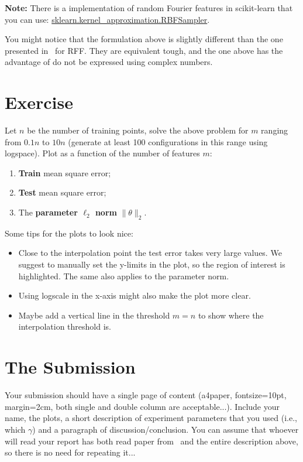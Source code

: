 \documentclass[a4paper,10pt]{article}
\newenvironment{note}
{
\begin{center}
\begin{lrbox}{\mybox}
\begin{minipage}{42em}}
{\end{minipage}
\end{lrbox}\fbox{\usebox{\mybox}}
\end{center}}
\begin{document}
    \begin{note}
    \textbf{Note:} There is a implementation of random Fourier features in scikit-learn that you can use:
    \href{https://scikit-learn.org/stable/modules/generated/sklearn.kernel_approximation.RBFSampler.html}{sklearn.kernel\_approximation.RBFSampler}.
    \end{note}
    
    \begin{note}
    You might notice that the formulation above is slightly different than the one presented in~\citet{belkin_reconciling_2019} for RFF. They are equivalent tough, and the one above has the advantage of do not be expressed using complex numbers.
    \end{note}
    

    

\section*{Exercise}

Let $n$ be the number of training points, solve the above problem for $m$ ranging from $0.1n$ to $10 n$ (generate at least 100 configurations in this range using logspace). Plot as a function of the number of features $m$:
\begin{enumerate}
    \item \textbf{Train} mean square error; 
    \item \textbf{Test} mean square error;
    \item  The \textbf{parameter $\ell_2$ norm} $\|\theta\|_2$.
\end{enumerate}

   \begin{note}
    Some tips for the plots to look nice:
    \begin{itemize}
        \item Close to the interpolation point the test error takes very
        large values. We suggest to manually set the y-limits in the plot, so the region of interest is highlighted. The same also applies to the parameter norm.
        \item Using logscale in the x-axis might also make the plot more clear.
        \item Maybe add a vertical line in the threshold $m=n$ to show where the interpolation threshold is.
    \end{itemize}
    \end{note}

\section*{The Submission}
Your submission should have a single page of content (a4paper, fontsize=10pt, margin=2cm, both single and double column are acceptable...).  Include your name, the plots, a short description of experiment parameters that you used (i.e., which $\gamma$) and a paragraph of discussion/conclusion. You can assume that whoever will read your report has both read paper from~\citep{belkin_reconciling_2019} and the entire description above, so there is no need for repeating it... 
\end{document}
